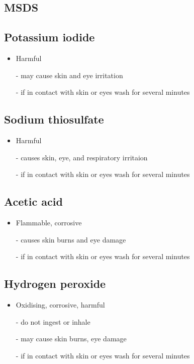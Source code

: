 \documentclass[a4paper, british]{article}
\begin{document}
\begin{appendices}

\section{MSDS}

\subsection*{Potassium iodide}

\begin{itemize}
    \item Harmful
    \item[-] may cause skin and eye irritation
    \item[-] if in contact with skin or eyes wash for several minutes 
\end{itemize}

\subsection*{Sodium thiosulfate}

\begin{itemize}
    \item Harmful
    \item[-] causes skin, eye, and respiratory irritaion
    \item[-] if in contact with skin or eyes wash for several minutes  
\end{itemize}

\subsection*{Acetic acid}

\begin{itemize}
    \item Flammable, corrosive
    \item[-] causes skin burns and eye damage
    \item[-] if in contact with skin or eyes wash for several minutes  
\end{itemize}

\subsection*{Hydrogen peroxide}

\begin{itemize}
    \item Oxidising, corrosive, harmful
    \item[-] do not ingest or inhale
    \item[-] may cause skin burns, eye damage
    \item[-] if in contact with skin or eyes wash for several minutes  
\end{itemize}

\end{appendices}
\end{document}
